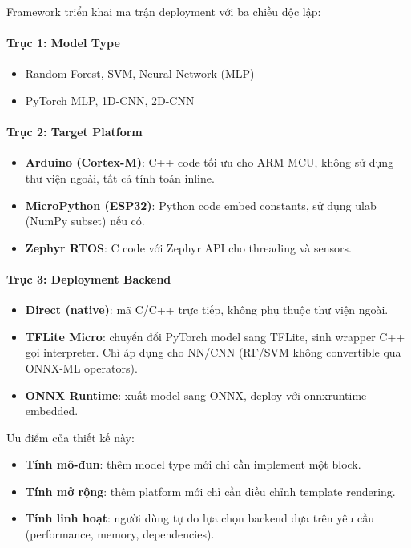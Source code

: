 Framework triển khai ma trận deployment với ba chiều độc lập:

\paragraph{Trục 1: Model Type}
\begin{itemize}
    \item Random Forest, SVM, Neural Network (MLP)
    \item PyTorch MLP, 1D-CNN, 2D-CNN
\end{itemize}

\paragraph{Trục 2: Target Platform}
\begin{itemize}
    \item \textbf{Arduino (Cortex-M)}: C++ code tối ưu cho ARM MCU, không sử dụng thư viện ngoài, tất cả tính toán inline.
    \item \textbf{MicroPython (ESP32)}: Python code embed constants, sử dụng ulab (NumPy subset) nếu có.
    \item \textbf{Zephyr RTOS}: C code với Zephyr API cho threading và sensors.
\end{itemize}

\paragraph{Trục 3: Deployment Backend}
\begin{itemize}
    \item \textbf{Direct (native)}: mã C/C++ trực tiếp, không phụ thuộc thư viện ngoài.
    \item \textbf{TFLite Micro}: chuyển đổi PyTorch model sang TFLite, sinh wrapper C++ gọi interpreter. Chỉ áp dụng cho NN/CNN (RF/SVM không convertible qua ONNX-ML operators).
    \item \textbf{ONNX Runtime}: xuất model sang ONNX, deploy với onnxruntime-embedded.
\end{itemize}

Ưu điểm của thiết kế này:
\begin{itemize}
    \item \textbf{Tính mô-đun}: thêm model type mới chỉ cần implement một block.
    \item \textbf{Tính mở rộng}: thêm platform mới chỉ cần điều chỉnh template rendering.
    \item \textbf{Tính linh hoạt}: người dùng tự do lựa chọn backend dựa trên yêu cầu (performance, memory, dependencies).
\end{itemize}

